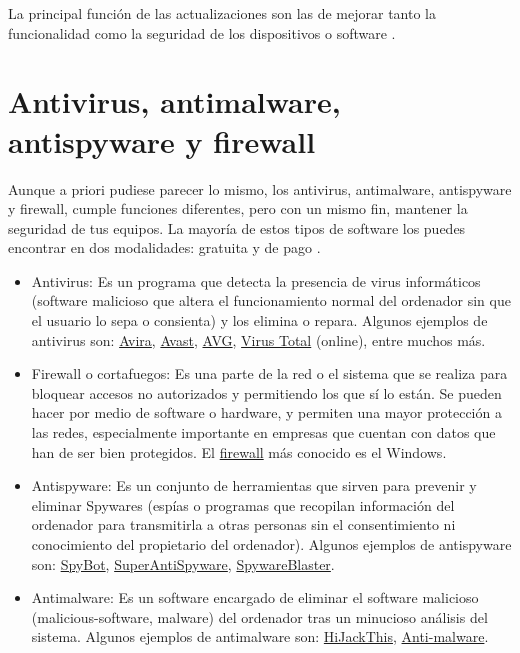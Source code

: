 \documentclass[
  spanish,
  a4paper,
  openany]{book}
\begin{document}
La principal función de las actualizaciones son las de mejorar tanto la funcionalidad como la seguridad de los dispositivos o software \citep{OSI-actualizaciones}.

\hypertarget{antivirus-antimalware-antispyware-y-firewall}{%
\section{Antivirus, antimalware, antispyware y firewall}\label{antivirus-antimalware-antispyware-y-firewall}}

Aunque a priori pudiese parecer lo mismo, los antivirus, antimalware, antispyware y firewall, cumple funciones diferentes, pero con un mismo fin, mantener la seguridad de tus equipos. La mayoría de estos tipos de software los puedes encontrar en dos modalidades: gratuita y de pago \citep{software-seguridad}.

\begin{itemize}
\item
  Antivirus: Es un programa que detecta la presencia de virus informáticos (software malicioso que altera el funcionamiento normal del ordenador sin que el usuario lo sepa o consienta) y los elimina o repara. Algunos ejemplos de antivirus son: \href{https://www.avira.com/es}{Avira}, \href{https://www.avast.com/es-es/index\#pc}{Avast}, \href{https://www.avg.com/es-es/homepage\#pc}{AVG}, \href{https://www.virustotal.com/gui/}{Virus Total} (online), entre muchos más.
\item
  Firewall o cortafuegos: Es una parte de la red o el sistema que se realiza para bloquear accesos no autorizados y permitiendo los que sí lo están. Se pueden hacer por medio de software o hardware, y permiten una mayor protección a las redes, especialmente importante en empresas que cuentan con datos que han de ser bien protegidos. El \href{https://en.wikipedia.org/wiki/Windows_Firewall}{firewall} más conocido es el Windows.
\item
  Antispyware: Es un conjunto de herramientas que sirven para prevenir y eliminar Spywares (espías o programas que recopilan información del ordenador para transmitirla a otras personas sin el consentimiento ni conocimiento del propietario del ordenador). Algunos ejemplos de antispyware son: \href{https://www.safer-networking.org/}{SpyBot}, \href{https://www.superantispyware.com/}{SuperAntiSpyware}, \href{https://www.brightfort.com/spywareblaster.html}{SpywareBlaster}.
\item
  Antimalware: Es un software encargado de eliminar el software malicioso (malicious-software, malware) del ordenador tras un minucioso análisis del sistema. Algunos ejemplos de antimalware son: \href{https://www.infospyware.com/antimalware/hijackthis/}{HiJackThis}, \href{https://www.malwarebytes.com/}{Anti-malware}.
\end{itemize}
\end{document}
